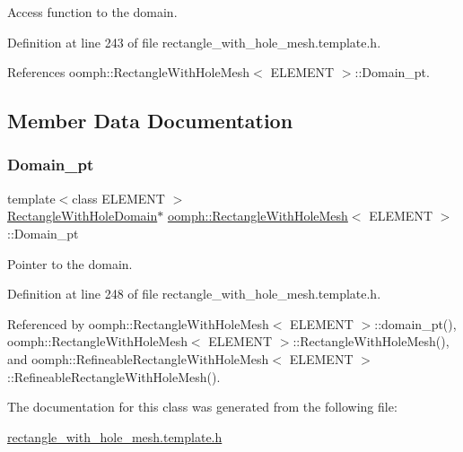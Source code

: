 Access function to the domain. 



Definition at line 243 of file rectangle\+\_\+with\+\_\+hole\+\_\+mesh.\+template.\+h.



References oomph\+::\+Rectangle\+With\+Hole\+Mesh$<$ E\+L\+E\+M\+E\+N\+T $>$\+::\+Domain\+\_\+pt.



\subsection{Member Data Documentation}
\mbox{\label{classoomph_1_1RectangleWithHoleMesh_a04b200644403da650d38e707285e2b53}} 
\subsubsection{\texorpdfstring{Domain\+\_\+pt}{Domain\_pt}}
{\footnotesize\ttfamily template$<$class E\+L\+E\+M\+E\+NT $>$ \\
\hyperlink{classoomph_1_1RectangleWithHoleDomain}{Rectangle\+With\+Hole\+Domain}$\ast$ \hyperlink{classoomph_1_1RectangleWithHoleMesh}{oomph\+::\+Rectangle\+With\+Hole\+Mesh}$<$ E\+L\+E\+M\+E\+NT $>$\+::Domain\+\_\+pt\hspace{0.3cm}{\ttfamily [protected]}}



Pointer to the domain. 



Definition at line 248 of file rectangle\+\_\+with\+\_\+hole\+\_\+mesh.\+template.\+h.



Referenced by oomph\+::\+Rectangle\+With\+Hole\+Mesh$<$ E\+L\+E\+M\+E\+N\+T $>$\+::domain\+\_\+pt(), oomph\+::\+Rectangle\+With\+Hole\+Mesh$<$ E\+L\+E\+M\+E\+N\+T $>$\+::\+Rectangle\+With\+Hole\+Mesh(), and oomph\+::\+Refineable\+Rectangle\+With\+Hole\+Mesh$<$ E\+L\+E\+M\+E\+N\+T $>$\+::\+Refineable\+Rectangle\+With\+Hole\+Mesh().



The documentation for this class was generated from the following file\+:\begin{DoxyCompactItemize}
\item 
\hyperlink{rectangle__with__hole__mesh_8template_8h}{rectangle\+\_\+with\+\_\+hole\+\_\+mesh.\+template.\+h}\end{DoxyCompactItemize}
